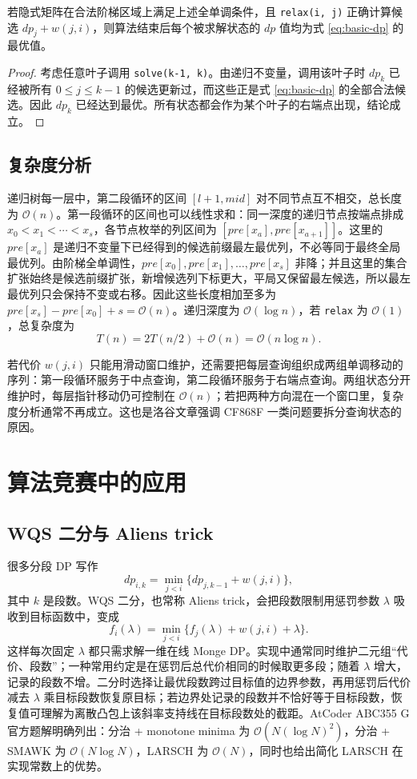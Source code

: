 \documentclass[lang=cn,a4paper,newtx,code=minted,bibtex]{elegantpaper}
\newcommand{\BigO}{\mathcal{O}}
\begin{document}
\begin{theorem}
若隐式矩阵在合法阶梯区域上满足上述全单调条件，且 \lstinline{relax(i, j)} 正确计算候选 $dp_j+w(j,i)$，则算法结束后每个被求解状态的 $dp$ 值均为式 \eqref{eq:basic-dp} 的最优值。
\end{theorem}

\begin{proof}
考虑任意叶子调用 \lstinline{solve(k-1, k)}。由递归不变量，调用该叶子时 $dp_k$ 已经被所有 $0\le j\le k-1$ 的候选更新过，而这些正是式 \eqref{eq:basic-dp} 的全部合法候选。因此 $dp_k$ 已经达到最优。所有状态都会作为某个叶子的右端点出现，结论成立。
\end{proof}

\subsection{复杂度分析}

递归树每一层中，第二段循环的区间 $[l+1,mid]$ 对不同节点互不相交，总长度为 $\BigO(n)$。第一段循环的区间也可以线性求和：同一深度的递归节点按端点排成 $x_0<x_1<\cdots<x_s$，各节点枚举的列区间为 $[pre[x_a],pre[x_{a+1}]]$。这里的 $pre[x_a]$ 是递归不变量下已经得到的候选前缀最左最优列，不必等同于最终全局最优列。由阶梯全单调性，$pre[x_0],pre[x_1],\ldots,pre[x_s]$ 非降；并且这里的集合扩张始终是候选前缀扩张，新增候选列下标更大，平局又保留最左候选，所以最左最优列只会保持不变或右移。因此这些长度相加至多为 $pre[x_s]-pre[x_0]+s=\BigO(n)$。递归深度为 $\BigO(\log n)$，若 \lstinline{relax} 为 $\BigO(1)$，总复杂度为
\[
  T(n)=2T(n/2)+\BigO(n)=\BigO(n\log n).
\]

若代价 $w(j,i)$ 只能用滑动窗口维护，还需要把每层查询组织成两组单调移动的序列：第一段循环服务于中点查询，第二段循环服务于右端点查询。两组状态分开维护时，每层指针移动仍可控制在 $\BigO(n)$；若把两种方向混在一个窗口里，复杂度分析通常不再成立。这也是洛谷文章强调 CF868F 一类问题要拆分查询状态的原因\cite{luogu2025larsch}。

\section{算法竞赛中的应用}
\label{sec:applications}

\subsection{WQS 二分与 Aliens trick}

很多分段 DP 写作
\[
  dp_{i,k}=\min_{j<i}\{dp_{j,k-1}+w(j,i)\},
\]
其中 $k$ 是段数。WQS 二分，也常称 Aliens trick，会把段数限制用惩罚参数 $\lambda$ 吸收到目标函数中，变成
\[
  f_i(\lambda)=\min_{j<i}\{f_j(\lambda)+w(j,i)+\lambda\}.
\]
这样每次固定 $\lambda$ 都只需求解一维在线 Monge DP。实现中通常同时维护二元组“代价、段数”；一种常用约定是在惩罚后总代价相同的时候取更多段；随着 $\lambda$ 增大，记录的段数不增。二分时选择让最优段数跨过目标值的边界参数，再用惩罚后代价减去 $\lambda$ 乘目标段数恢复原目标；若边界处记录的段数并不恰好等于目标段数，恢复值可理解为离散凸包上该斜率支持线在目标段数处的截距。AtCoder ABC355 G 官方题解明确列出：分治 + monotone minima 为 $\BigO(N(\log N)^2)$，分治 + SMAWK 为 $\BigO(N\log N)$，LARSCH 为 $\BigO(N)$，同时也给出简化 LARSCH 在实现常数上的优势\cite{atcoder2024abc355g}。
\end{document}
